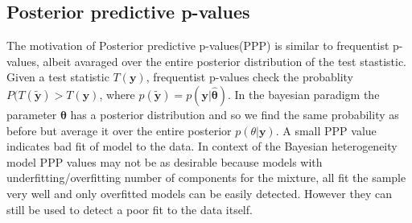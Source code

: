 \subsection{Posterior predictive p-values}
The motivation of Posterior predictive p-values(PPP) is similar to frequentist p-values, albeit avaraged over the entire posterior distribution of the test stastistic. Given a test statistic $T(\boldsymbol{y})$, frequentist p-values check the probablity $P(T(\boldsymbol{\tilde{y}}) > T(\boldsymbol{y})$, where $p(\boldsymbol{\tilde{y}}) = p(\boldsymbol{y}|\boldsymbol{\hat{\theta}})$. In the bayesian paradigm the parameter $\boldsymbol{\theta}$ has a posterior distribution and so we find the same probability as before but average it over the entire posterior $p(\theta|\boldsymbol{y})$. A small PPP value indicates bad fit of model to the data. In context of the Bayesian heterogeneity model PPP values may not be as desirable because models with underfitting/overfitting number of components for the mixture, all fit the sample very well and only overfitted models can be easily detected. However they can still be used to detect a poor fit to the data itself.
